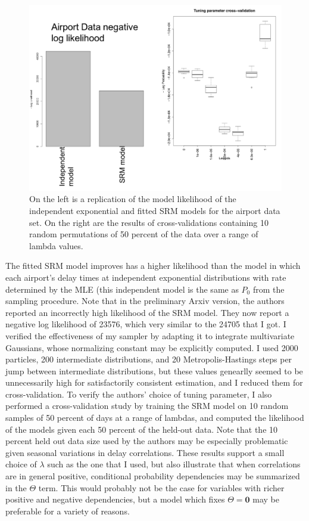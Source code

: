 \documentclass{samkoelleprelimworking}
\begin{document}
 \begin{figure}\label{fig:likelihoods}
\includegraphics[width=\textwidth]{likelihoods}
\caption{On the left is a replication of the model likelihood of the independent exponential and fitted SRM models for the airport data set.  On the right are the results of cross-validations containing 10 random permutations of 50 percent of the data over a range of lambda values.}
\end{figure}

The fitted SRM model improves has a higher likelihood than the model in which each airport's delay times at independent exponential distributions with rate determined by the MLE (this independent model is the same as $P_0$ from the sampling procedure.  Note that in the preliminary Arxiv version, the authors reported an incorrectly high likelihood of the SRM model.  They now report a negative log likelihood of 23576, which very similar to the 24705 that I got. I verified the effectiveness of my sampler by adapting it to integrate multivariate Gaussians, whose normalizing constant may be explicitly computed.  I used 2000 particles, 200 intermediate distributions, and 20 Metropolis-Hastings steps per jump between intermediate distributions, but these values genearlly seemed to be unnecessarily high for satisfactorily consistent estimation, and I reduced them for cross-validation.  To verify the authors' choice of tuning parameter, I also performed a cross-validation study by training the SRM model on 10 random samples of 50 percent of days at a range of lambdas, and computed the likelihood of the models given each 50 percent of the held-out data.  Note that the 10 percent held out data size used by the authors may be especially problematic given seasonal variations in delay correlations.  These results support a small choice of $\lambda$ such as the one that I used, but also illustrate that when correlations are in general positive, conditional probability dependencies may be summarized in the $\Theta$ term.   This would probably not be the case for variables with richer positive and negative dependencies, but a model which fixes $\Theta = \bm{0}$ may be preferable for a variety of reasons.
\end{document}
